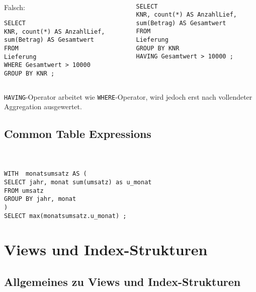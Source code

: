 \begin{frame}[fragile]\frametitle{\insertsection}
\framesubtitle{\insertsubsection}
\onslide
{}\\[8pt]
\pause
\begin{columns}
\begin{column}{.48\textwidth}
\alert{Falsch:}
\begin{lstlisting}[xleftmargin=3ex]
SELECT
KNR, count(*) AS AnzahlLief,
sum(Betrag) AS Gesamtwert
FROM
Lieferung
WHERE Gesamtwert > 10000
GROUP BY KNR ;
\end{lstlisting}
\end{column}
\pause 
\begin{column}{.48\textwidth}
\begin{lstlisting}[xleftmargin=3ex]
SELECT
KNR, count(*) AS AnzahlLief,
sum(Betrag) AS Gesamtwert
FROM
Lieferung
GROUP BY KNR
HAVING Gesamtwert > 10000 ;
\end{lstlisting}
\end{column}
\end{columns}
\abs 
\texttt{HAVING}-Operator arbeitet wie \texttt{WHERE}-Operator, wird jedoch erst nach vollendeter Aggregation ausgewertet.
\end{frame}

\subsection{Common Table Expressions}
\begin{frame}[fragile]\frametitle{\insertsection}
\framesubtitle{\insertsubsection}
\\[4pt]
\abs
\begin{lstlisting}[xleftmargin=3ex]
WITH  monatsumsatz AS (
SELECT jahr, monat sum(umsatz) as u_monat
FROM umsatz
GROUP BY jahr, monat
)
SELECT max(monatsumsatz.u_monat) ;
\end{lstlisting}
\end{frame}

\section{Views und Index-Strukturen}
\subsection{Allgemeines zu Views und Index-Strukturen}

